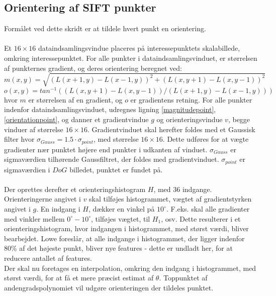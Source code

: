 \subsection{Orientering af SIFT punkter}
Formålet ved dette skridt er at tildele hvert punkt en orientering.
\\
\\
Et $16\times 16$ dataindsamlingsvindue placeres på interessepunktets skalabillede, omkring interessepunktet. For alle punkter i dataindsamlingsvinduet, er størrelsen af punkternes gradient, og deres orientering beregnet ved:
\begin{equation}
m(x,y) = \sqrt{(L(x + 1, y) - L(x - 1, y))^2 + (L(x, y + 1) - L(x, y - 1))^2} 
\label{magnitudepoint}
\end{equation}
\begin{equation}o(x,y) = tan^{-1}((L(x,y+1) - L(x,y-1))/(L(x+1, y) - L(x-1, y))) 
\label{orientationpoint}
\end{equation}
hvor $m$ er størrelsen af en gradient, og $o$ er gradientens retning. For alle punkter indenfor dataindsamlingsvinduet, udregnes ligning
\eqref{magnitudepoint}, \eqref{orientationpoint}, og danner et gradientvindue $g$ og orienteringsvindue $v$, begge vinduer af størrelse $16\times16$. Gradientvinduet skal herefter foldes med et Gaussisk filter hvor $\sigma_{Gauss} = 1.5 \cdot \sigma_{point}$, med størrelse $16\times16$. Dette udføres for at vægte gradienter nær punktet højere end punkter i udkanten af vinduet.  $\sigma_{Gauss}$ er sigmaværdien tilhørende Gaussfiltret, der foldes med gradientvinduet. $\sigma_{point}$ er sigmaværdien i $DoG$ billedet, punktet er fundet på. 
\\
\\
Der oprettes derefter et orienteringshistogram $H$, med 36 indgange. Orienteringerne angivet i $v$ skal tilføjes histogrammet, vægtet af gradientstyrken angivet i $g$. En indgang i $H$, dækker en vinkel på $10^{\circ}$. F.eks. skal alle gradienter med vinkler mellem  $0^{\circ}-10^{\circ}$, tilføjes vægtet, til $H_1$, osv. Dette resulterer i et orienteringshistogram, hvor indgangen i histogrammet, med størst værdi, bliver bearbejdet. Lowe foreslår, at alle indgange i histogrammet, der ligger indenfor 80\% af det højeste punkt, bliver nye features - dette er undladt her, for at reducere antallet af features. 
\\
Der skal nu foretages en interpolation, omkring den indgang i histogrammet, med størst værdi, for at få et mere præcist estimat af $\theta$. Toppunktet af andengradspolynomiet vil udgøre orienteringen der tildeles punktet. 
